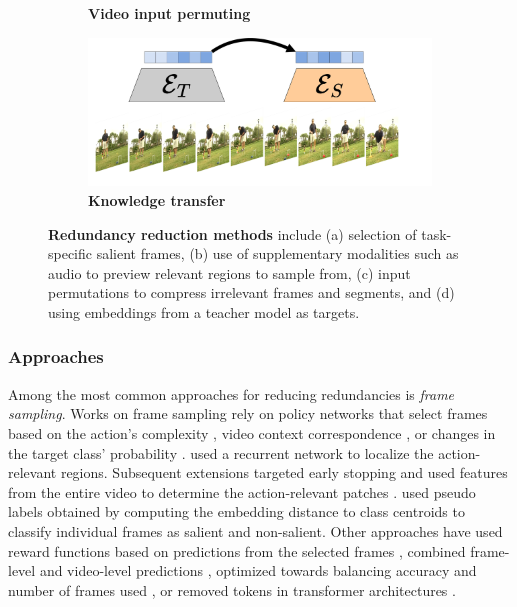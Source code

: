 \begin{figure}[t]
\begin{subfigure}[b]{0.49\linewidth}
         \caption{\textbf{Video input permuting}}
         \label{fig:redundancies_reduction::permute}
     \end{subfigure}
     \hfill
     \begin{subfigure}[b]{0.49\linewidth}
         \centering
         \includegraphics[width=\linewidth]{figs/redundancies_reduction/redudancies_transfer.pdf}
         \caption{\textbf{Knowledge transfer}}
         \label{fig:redundancies_reduction::transfer}
     \end{subfigure}
        \caption{\textbf{Redundancy reduction methods} include (a) selection of task-specific salient frames, (b) use of supplementary modalities such as audio to preview relevant regions to sample from, (c) input permutations to compress irrelevant frames and segments, and (d) using embeddings from a teacher model as targets.}
        \label{fig:redundancies_reduction}
\end{figure}



\subsubsection{Approaches}

Among the most common approaches for reducing redundancies is \emph{frame sampling}. Works on frame sampling rely on policy networks that select frames based on the action's complexity \citep{ghodrati2021frameexit,yeung2016end}, video context correspondence \citep{wu2019adaframe}, or changes in the target class' probability \citep{korbar2019scsampler}. \citet{wang2021adaptive} used a recurrent network to localize the action-relevant regions. Subsequent extensions targeted early stopping \citep{wang2022adafocus} and used features from the entire video to determine the action-relevant patches \citep{wang2022adafocusv3}. \citet{xia2022nsnet} used pseudo labels obtained by computing the embedding distance to class centroids to classify individual frames as salient and non-salient. Other approaches have used reward functions based on predictions from the selected frames \citep{wu2020dynamic}, combined frame-level and video-level predictions \citep{gowda2021smart}, optimized towards balancing accuracy and number of frames used \citep{wu2019liteeval}, or removed tokens in transformer architectures \citep{wu2024haltingvt}. %

